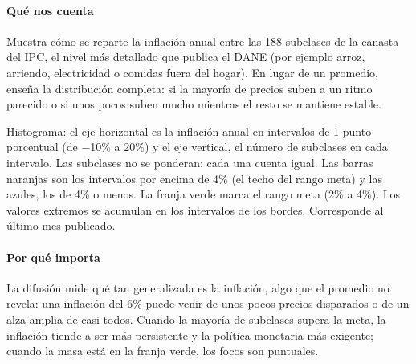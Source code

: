 \paragraph{Qué nos cuenta}
Muestra cómo se reparte la inflación anual entre las 188 subclases de la canasta del IPC, el nivel más detallado que publica el DANE (por ejemplo arroz, arriendo, electricidad o comidas fuera del hogar). En lugar de un promedio, enseña la distribución completa: si la mayoría de precios suben a un ritmo parecido o si unos pocos suben mucho mientras el resto se mantiene estable.

\begin{leer}
Histograma: el eje horizontal es la inflación anual en intervalos de 1 punto porcentual (de −10\% a 20\%) y el eje vertical, el número de subclases en cada intervalo. Las subclases no se ponderan: cada una cuenta igual. Las barras naranjas son los intervalos por encima de 4\% (el techo del rango meta) y las azules, los de 4\% o menos. La franja verde marca el rango meta (2\% a 4\%). Los valores extremos se acumulan en los intervalos de los bordes. Corresponde al último mes publicado.
\end{leer}

\paragraph{Por qué importa}
La difusión mide qué tan generalizada es la inflación, algo que el promedio no revela: una inflación del 6\% puede venir de unos pocos precios disparados o de un alza amplia de casi todos. Cuando la mayoría de subclases supera la meta, la inflación tiende a ser más persistente y la política monetaria más exigente; cuando la masa está en la franja verde, los focos son puntuales.

